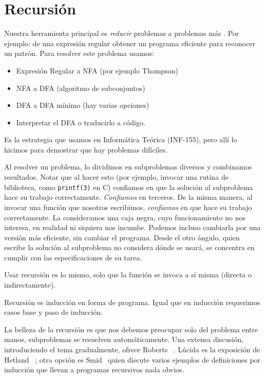

\chapter{Recursión}
\label{cha:recursion}


  Nuestra herramienta principal
  es \emph{reducir} problemas a problemas más .
  Por ejemplo:
  de una expresión regular obtener
  un programa eficiente para reconocer un patrón.
  Para resolver este problema usamos:
  \begin{itemize}
  \item
    Expresión Regular a NFA (por ejemplo Thompson)
  \item
    NFA a DFA (algoritmo de subconjuntos)
  \item
    DFA a DFA mínimo (hay varias opciones)
  \item Interpretar el DFA o traducirlo a código.
  \end{itemize}
  Es la estrategia que usamos en Informática Teórica
  (INF-155),
  pero allí lo hicimos para demostrar que hay problemas difíciles.

  Al resolver un problema,
  lo dividimos en subproblemas diversos y combinamos resultados.
  Notar que al hacer esto
  (por ejemplo,
   invocar una rutina de biblioteca,
   como \texttt{printf(3)} en C)
  confiamos en que la solución al subproblema
  hace su trabajo correctamente.
  \emph{Confiamos} en terceros.
  De la misma manera,
  al invocar una función que nosotros escribimos,
  \emph{confiamos} en que hace su trabajo correctamente.
  La consideramos una caja negra,
  cuyo funcionamiento no nos interesa,
  en realidad ni siquiera nos incumbe.
  Podemos incluso cambiarla por una versión más eficiente,
  sin cambiar el programa.
  Desde el otro ángulo,
  quien escribe la solución al subproblema no considera dónde se usará,
  se concentra en cumplir con las especificaciones de su tarea.

  Usar recursión es lo mismo,
  solo que la función se invoca a sí misma
  (directa o indirectamente).

  Recursión es inducción en forma de programa.
  Igual que en inducción requerimos casos base y paso de inducción.

  La belleza de la recursión es que nos debemos preocupar
  solo del problema entre manos,
  subproblemas se resuelven automáticamente.
  Una extensa discusión,
  introduciendo el tema gradualmente,
  ofrece Roberts~%
    \cite{roberts86:_thinking_recursively}.
  Lúcida es la exposición de Hetland~%
    \cite[capítulo~4]{hetland14:_python_algorithms};
  otra opción es Smid~%
    \cite[capítulo~4]{smid19:_discr_struct_comput_scien}
  quien discute varios ejemplos de definiciones por inducción
  que llevan a programas recursivos nada obvios.

